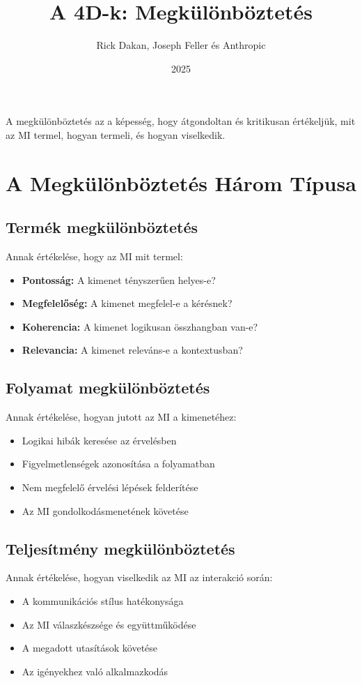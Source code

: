 \documentclass[a4paper, 11pt]{article}
\makeatletter
\renewcommand{\maketitle}{
  \begin{center}
    {\fontsize{22}{26}\bfseries\color{primary}\@title}
    \vspace{0.5em}
    {\color{lightgray}\titlerule[3pt]}
    \vspace{1.5em}
  \end{center}
}
\newenvironment{customquote}
  {\begin{tcolorbox}[
    left=4mm,
    right=4mm,
    top=4mm,
    bottom=4mm,
    colback=lightgray,
    colframe=accent,
    leftrule=4mm,
    rightrule=0mm,
    toprule=0mm,
    bottomrule=0mm,
    arc=2mm,
    outer arc=2mm
  ]}
  {\end{tcolorbox}}
\makeatother
\begin{document}
\title{A 4D-k: Megkülönböztetés}
\author{Rick Dakan, Joseph Feller és Anthropic}
\date{2025}
\maketitle


\begin{customquote}
A megkülönböztetés az a képesség, hogy átgondoltan és kritikusan értékeljük, mit az MI termel, hogyan termeli, és hogyan viselkedik.
\end{customquote}

\section{A Megkülönböztetés Három Típusa}

\subsection{Termék megkülönböztetés}
Annak értékelése, hogy az MI mit termel:
\begin{itemize}
\item \textbf{Pontosság:} A kimenet tényszerűen helyes-e?
\item \textbf{Megfelelőség:} A kimenet megfelel-e a kérésnek?
\item \textbf{Koherencia:} A kimenet logikusan összhangban van-e?
\item \textbf{Relevancia:} A kimenet releváns-e a kontextusban?
\end{itemize}

\subsection{Folyamat megkülönböztetés}
Annak értékelése, hogyan jutott az MI a kimenetéhez:
\begin{itemize}
\item Logikai hibák keresése az érvelésben
\item Figyelmetlenségek azonosítása a folyamatban
\item Nem megfelelő érvelési lépések felderítése
\item Az MI gondolkodásmenetének követése
\end{itemize}

\subsection{Teljesítmény megkülönböztetés}
Annak értékelése, hogyan viselkedik az MI az interakció során:
\begin{itemize}
\item A kommunikációs stílus hatékonysága
\item Az MI válaszkészsége és együttműködése
\item A megadott utasítások követése
\item Az igényekhez való alkalmazkodás
\end{itemize}
\end{document}
